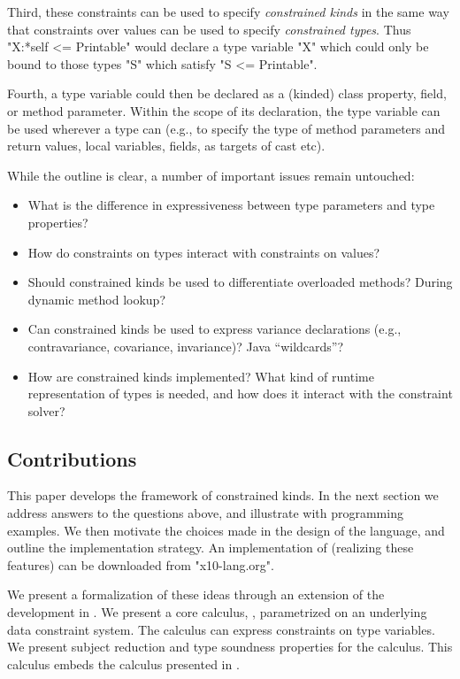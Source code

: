 Third, these constraints can be used to specify {\em constrained
kinds} in the same way that constraints over values can be used to
specify {\em constrained types}. Thus \xcd"X:*{self <= Printable}"
would declare a type variable \xcd"X" which could only be bound to
those types \xcd"S" which satisfy \xcd"S <= Printable".

Fourth, a type variable could then be declared as a (kinded) class
property, field, or method parameter. Within the scope of its
declaration, the type variable can be used wherever a type can (e.g.,
to specify the type of method parameters and return values, local
variables, fields, as targets of cast etc).

While the outline is clear, a number of important issues remain untouched:
\begin{itemize}
\item What is the difference in expressiveness between type parameters and type properties? 

\item How do constraints on types interact with constraints on values?

\item Should constrained kinds be used to differentiate overloaded methods? During dynamic method lookup?

\item Can constrained kinds be used to express variance declarations (e.g., contravariance, covariance, invariance)? Java ``wildcards''?

\item How are constrained kinds implemented? What kind of runtime representation of types is needed, and how does it interact with the constraint solver?
\end{itemize}

\subsection{Contributions}

This paper develops the framework of constrained kinds. In the next
section we address answers to the questions above, and illustrate with
programming examples. We then motivate the choices made in the design
of the \Xten{} language, and outline the implementation strategy. An
implementation of \Xten{} (realizing these features) can be downloaded
from \xcd"x10-lang.org". 

We present a formalization of these ideas through an extension of the
development in \cite{constrained-types}. We present a core calculus,
\FXG{}, parametrized on an underlying data constraint system. The
calculus can express  constraints on type variables. We
present subject reduction and type soundness properties for the
calculus. This calculus embeds the calculus presented in
\cite{constrained-types}. 

